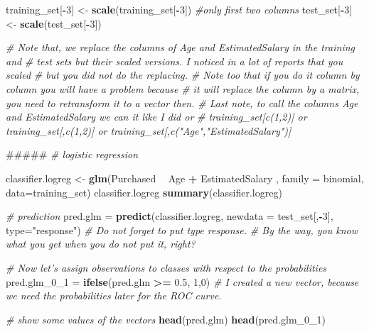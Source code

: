 \documentclass[]{book}
\newenvironment{Shaded}{\begin{snugshade}}{\end{snugshade}}
\newcommand{\KeywordTok}[1]{\textcolor[rgb]{0.13,0.29,0.53}{\textbf{#1}}}
\newcommand{\DataTypeTok}[1]{\textcolor[rgb]{0.13,0.29,0.53}{#1}}
\newcommand{\DecValTok}[1]{\textcolor[rgb]{0.00,0.00,0.81}{#1}}
\newcommand{\FloatTok}[1]{\textcolor[rgb]{0.00,0.00,0.81}{#1}}
\newcommand{\StringTok}[1]{\textcolor[rgb]{0.31,0.60,0.02}{#1}}
\newcommand{\CommentTok}[1]{\textcolor[rgb]{0.56,0.35,0.01}{\textit{#1}}}
\newcommand{\OperatorTok}[1]{\textcolor[rgb]{0.81,0.36,0.00}{\textbf{#1}}}
\newcommand{\NormalTok}[1]{#1}
\theoremstyle{definition}
\theoremstyle{definition}
\theoremstyle{definition}
\theoremstyle{remark}
\begin{document}
\begin{Shaded}
\begin{Highlighting}[]
\NormalTok{training_set[}\OperatorTok{-}\DecValTok{3}\NormalTok{] <-}\StringTok{ }\KeywordTok{scale}\NormalTok{(training_set[}\OperatorTok{-}\DecValTok{3}\NormalTok{]) }\CommentTok{#only first two columns}
\NormalTok{test_set[}\OperatorTok{-}\DecValTok{3}\NormalTok{] <-}\StringTok{ }\KeywordTok{scale}\NormalTok{(test_set[}\OperatorTok{-}\DecValTok{3}\NormalTok{])}

\CommentTok{# Note that, we replace the columns of Age and EstimatedSalary in the training and}
\CommentTok{# test sets but their scaled versions. I noticed in a lot of reports that you scaled}
\CommentTok{# but you did not do the replacing.}
\CommentTok{# Note too that if you do it column by column you will have a problem because }
\CommentTok{# it will replace the column by a matrix, you need to retransform it to a vector then.}
\CommentTok{# Last note, to call the columns Age and EstimatedSalary we can it like I did or }
\CommentTok{# training_set[c(1,2)] or training_set[,c(1,2)] or training_set[,c("Age","EstimatedSalary")]}


\NormalTok{#####}
\CommentTok{# logistic regression}

\NormalTok{classifier.logreg <-}\StringTok{ }\KeywordTok{glm}\NormalTok{(Purchased }\OperatorTok{~}\StringTok{ }\NormalTok{Age }\OperatorTok{+}\StringTok{ }\NormalTok{EstimatedSalary , }\DataTypeTok{family =}\NormalTok{ binomial, }\DataTypeTok{data=}\NormalTok{training_set)}
\NormalTok{classifier.logreg}
\KeywordTok{summary}\NormalTok{(classifier.logreg)}

\CommentTok{# prediction}
\NormalTok{pred.glm =}\StringTok{ }\KeywordTok{predict}\NormalTok{(classifier.logreg, }\DataTypeTok{newdata =}\NormalTok{ test_set[,}\OperatorTok{-}\DecValTok{3}\NormalTok{], }\DataTypeTok{type=}\StringTok{"response"}\NormalTok{)}
\CommentTok{# Do not forget to put type response. }
\CommentTok{# By the way, you know what you get when you do not put it, right?}

\CommentTok{# Now let's assign observations to classes with respect to the probabilities}
\NormalTok{pred.glm_0_}\DecValTok{1}\NormalTok{ =}\StringTok{ }\KeywordTok{ifelse}\NormalTok{(pred.glm }\OperatorTok{>=}\StringTok{ }\FloatTok{0.5}\NormalTok{, }\DecValTok{1}\NormalTok{,}\DecValTok{0}\NormalTok{)}
\CommentTok{# I created a new vector, because we need the probabilities later for the ROC curve.}

\CommentTok{# show some values of the vectors}
\KeywordTok{head}\NormalTok{(pred.glm)}
\KeywordTok{head}\NormalTok{(pred.glm_0_}\DecValTok{1}\NormalTok{)}


\end{Highlighting}
\end{Shaded}
\end{document}
